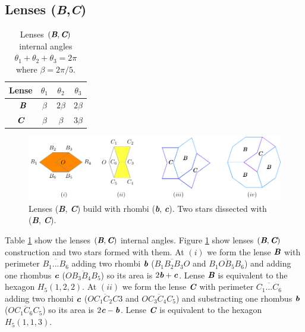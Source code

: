 \documentclass[11pt]{article}
\def\mathbi#1{\textbf{\em #1}}
\begin{document}
\subsection{Lenses (\mathbi{B},\mathbi{C})}

\begin{table}[H]
\begin{center}
\begin{tabular}{|c|c c c|} \hline
Lense & $\theta_1$ & $\theta_2$ & $\theta_3$ \\ \hline\
$\mathbi{B}$ & $\beta$ & $2\beta$ & $2\beta$ \\[0.5ex] \hline
$\mathbi{C}$ & $\beta$ & $\beta$ & $3\beta$ \\[0.5ex] \hline
\end{tabular}
\caption{Lenses $(\mathbi{B},\mathbi{C})$ internal angles $\theta_1+\theta_2+\theta_3 = 2\pi$ where $\beta = 2\pi/5$.} 
\label{tbl:bc-lenses-angles}
\end{center}
\end{table}

\begin{figure}[H]
\centering
\includegraphics[scale=1.1]{bc/hexagons}
\caption{Lenses (\mathbi{B}, \mathbi{C}) build with rhombi (\mathbi{b}, \mathbi{c}). Two stars dissected with (\mathbi{B}, \mathbi{C}).}
\label{fig:bc-hexagons}
\end{figure}

Table \ref{tbl:bc-lenses-angles} show the lenses $(\mathbi{B},\mathbi{C})$ internal angles.
Figure \ref{fig:bc-hexagons} show lenses $(\mathbi{B},\mathbi{C})$ construction and two stars formed with them.
At $(i)$ we form the lense $\mathbi{B}$ with perimeter $\overline{B_1...B_6}$ adding two rhombi $\mathbi{b}$ ($\overline{B_1B_2B_3O}$ and $\overline{B_1OB_5B_6}$) and adding one rhombus $\mathbi{c}$ ($\overline{OB_3B_4B_5}$) so its area is $2\mathbi{b} + \mathbi{c}$. Lense $\mathbi{B}$ is equivalent to the hexagon $H_5(1,2,2)$.
At $(ii)$ we form the lense $\mathbi{C}$ with perimeter $\overline{C_1...C_6}$ adding two rhombi $\mathbi{c}$ ($\overline{OC_1C_2C3}$ and $\overline{OC_3C_4C_5}$) and substracting one rhombus $\mathbi{b}$ ($\overline{OC_1C_6C_5}$) so its area is $2\mathbi{c} - \mathbi{b}$. Lense $\mathbi{C}$ is equivalent to the hexagon $H_5(1,1,3)$.
\end{document}

